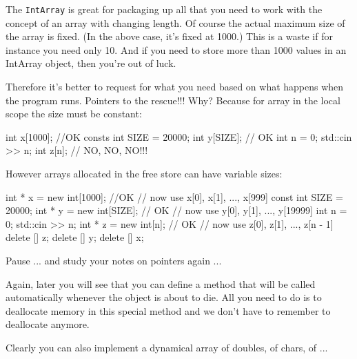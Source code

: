 \newpage{}

The \texttt{IntArray} is great for packaging up all that you need to work
with the concept of an array with changing length. Of course the actual
maximum size of the array is fixed. (In the above case, it's fixed at
1000.) This is a waste if for instance you need only 10. And if you need
to store more than 1000 values in an IntArray object, then
you're out of luck.

Therefore it's better to  request for what you need
based on what happens when the program runs. Pointers to the
rescue!!! Why? Because for array in the local scope the size must be
constant:

\begin{consolethree}[escapeinside=||]
int x[1000];                //OK
consts int SIZE = 20000;
int y[SIZE];                // OK
int n = 0;
std::cin >> n;
int z[n];                   // NO, NO, NO!!!
\end{consolethree}

However arrays allocated in the free store can have variable sizes:

\begin{consolethree}[escapeinside=||]
int * x = new int[1000]; //OK
// now use x[0], x[1], ..., x[999]
const int SIZE = 20000;
int * y = new int[SIZE]; // OK
// now use y[0], y[1], ..., y[19999]
int n = 0;
std::cin >> n;
int * z = new int[n];       // OK
// now use z[0], z[1], ..., z[n - 1]
delete [] z;
delete [] y;
delete [] x;
\end{consolethree}

Pause ... and study your notes on pointers again ...


Again, later you will see that you can define a method that will be
called automatically whenever the object is about to die. All you need
to do is to deallocate memory in this special method and we don't have
to remember to deallocate anymore.

Clearly you can also implement a dynamical array of doubles, of chars,
of ...
